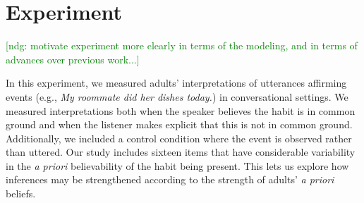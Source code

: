 \documentclass[10pt,letterpaper]{article}
\newcommand{\ndg}[1]{\textcolor{Green}{[ndg: #1]}}
\begin{document}



\section{Experiment}

\ndg{motivate experiment more clearly in terms of the modeling, and in terms of advances over previous work...}

In this experiment, we measured adults' interpretations of utterances affirming events (e.g., \emph{My roommate did her dishes today.}) in conversational settings.  
We measured interpretations both when the speaker believes the habit is in common ground and when the listener makes explicit that this is not in common ground.
Additionally, we included a control condition where the event is observed rather than uttered. 
Our study includes sixteen items that have considerable variability in the \emph{a priori} believability of the habit being present. 
This lets us explore how inferences may be strengthened according to the strength of adults' \emph{a priori} beliefs.
\end{document}

